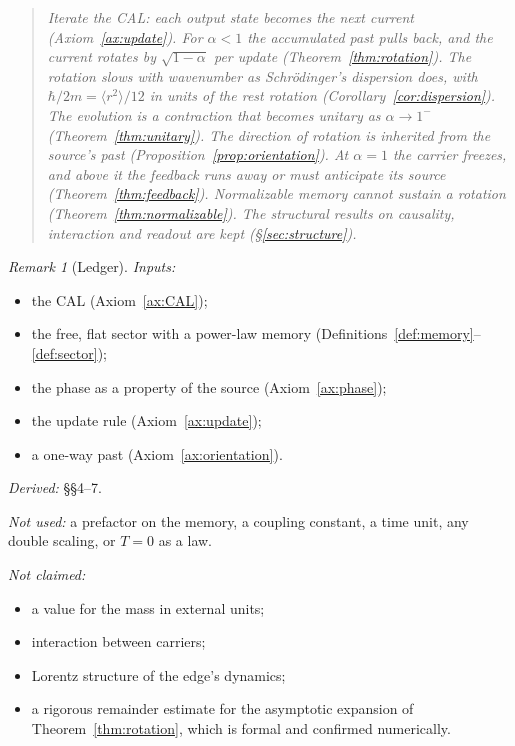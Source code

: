 \documentclass[11pt]{amsart}
\theoremstyle{definition}
\theoremstyle{remark}
\newtheorem{remark}[theorem]{Remark}
\begin{document}
\begin{quote}\itshape
Iterate the CAL: each output state becomes the next current (Axiom~\ref{ax:update}). For $\alpha<1$ the accumulated past pulls back, and the current rotates by $\sqrt{1-\alpha}$ per update (Theorem~\ref{thm:rotation}). The rotation slows with wavenumber as Schr\"odinger's dispersion does, with $\hbar/2m=\langle r^2\rangle/12$ in units of the rest rotation (Corollary~\ref{cor:dispersion}). The evolution is a contraction that becomes unitary as $\alpha\to1^-$ (Theorem~\ref{thm:unitary}). The direction of rotation is inherited from the source's past (Proposition~\ref{prop:orientation}). At $\alpha=1$ the carrier freezes, and above it the feedback runs away or must anticipate its source (Theorem~\ref{thm:feedback}). Normalizable memory cannot sustain a rotation (Theorem~\ref{thm:normalizable}). The structural results on causality, interaction and readout are kept (\S\ref{sec:structure}).
\end{quote}

\begin{remark}[Ledger]\label{rem:ledger}
\emph{Inputs:}
\begin{itemize}
\item the CAL (Axiom~\ref{ax:CAL});
\item the free, flat sector with a power-law memory (Definitions~\ref{def:memory}--\ref{def:sector});
\item the phase as a property of the source (Axiom~\ref{ax:phase});
\item the update rule (Axiom~\ref{ax:update});
\item a one-way past (Axiom~\ref{ax:orientation}).
\end{itemize}
\emph{Derived:} \S\S4--7.

\emph{Not used:} a prefactor on the memory, a coupling constant, a time unit, any double scaling, or $T=0$ as a law.

\emph{Not claimed:}
\begin{itemize}
\item a value for the mass in external units;
\item interaction between carriers;
\item Lorentz structure of the edge's dynamics;
\item a rigorous remainder estimate for the asymptotic expansion of Theorem~\ref{thm:rotation}, which is formal and confirmed numerically.
\end{itemize}
\end{remark}
\end{document}
